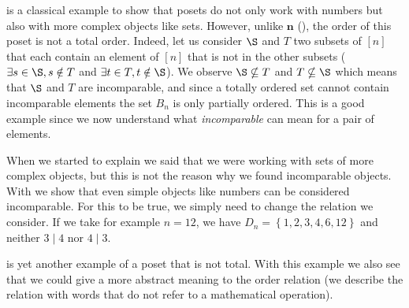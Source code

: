  is a classical example to show that posets do not only
work with numbers but also with more complex objects like sets. However, unlike
$\bm{n}$ (), the order of this poset is not a total order.
Indeed, let us consider $\S$ and $T$ two subsets of $[n]$ that each contain an
element of $[n]$ that is not in the other subsets ($\exists s \in \S, s \notin
T$ and $\exists t \in T, t \notin \S$). We observe $\S \nsubseteq T$ and $T
\nsubseteq \S$ which means that $\S$ and $T$ are incomparable, and since a
totally ordered set cannot contain incomparable elements the set $B_n$ is only
partially ordered. This is a good example since we now understand what
\emph{incomparable} can mean for a pair of elements.


When we started to explain  we said that we were working
with sets of more complex objects, but this is not the reason why we found
incomparable objects. With  we show that even simple
objects like numbers can be considered incomparable. For this to be true, we
simply need to change the relation we consider. If we take for example $n =
12$, we have $D_n = \left\{{1, 2, 3, 4, 6, 12}\right\}$ and neither $3 \mid 4$
nor $4 \mid 3$.


 is yet another example of a poset that is not total. With
this example we also see that we could give a more abstract meaning to the
order relation (we describe the relation with words that do not refer to a
mathematical operation).
